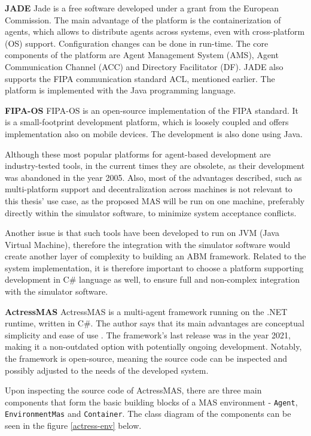 \documentclass[0main.tex]{subfiles}
\begin{document}
\textbf{JADE} \smallskip \newline 
Jade is a free software developed under a grant from the European Commission. The main advantage of the 
platform is the containerization of agents, which allows to distribute agents across systems, even 
with cross-platform (OS) support. Configuration changes can be done in run-time. The core components of 
the platform are Agent Management System (AMS), Agent Communication Channel (ACC) and Directory Facilitator (DF). 
JADE also supports the FIPA communication standard ACL, mentioned earlier. The platform is implemented with 
the Java programming language.

\textbf{FIPA-OS} \smallskip \newline 
FIPA-OS is an open-source implementation of the FIPA standard. It is a small-footprint development platform, 
which is loosely coupled and offers implementation also on mobile devices. The development is also done 
using Java. 

Although these most popular platforms for agent-based development are industry-tested tools, in the current 
times they are obsolete, as their development was abandoned in the year 2005. Also, most of the 
advantages described, such as multi-platform support and decentralization across machines is not relevant to 
this thesis' use case, as the proposed MAS will be run on one machine, preferably directly within the simulator 
software, to minimize system acceptance conflicts. 

Another issue is that such tools have been developed to run on JVM (Java Virtual Machine), therefore the integration 
with the simulator software would create another layer of complexity to building an ABM framework. 
Related to the system implementation, it is therefore important to choose a platform supporting 
development in C\# language as well, to ensure full and non-complex integration with the simulator 
software.

\textbf{ActressMAS} \smallskip \newline
ActressMAS is a multi-agent framework running on the .NET runtime, written in C\#. The author says that 
its main advantages are conceptual simplicity and ease of use \cite{Leon2022}. The framework's last release was 
in the year 2021, making it a non-outdated option with potentially ongoing development. Notably, the framework is 
open-source, meaning the source code can be inspected and possibly adjusted to the needs of the developed system.

Upon inspecting the source code of ActressMAS, there are three main components that form the basic building 
blocks of a MAS environment - \texttt{Agent}, \texttt{EnvironmentMas} and \texttt{Container}.
The class diagram of the components can be seen in the figure \ref{actress-env} below.
\end{document}
